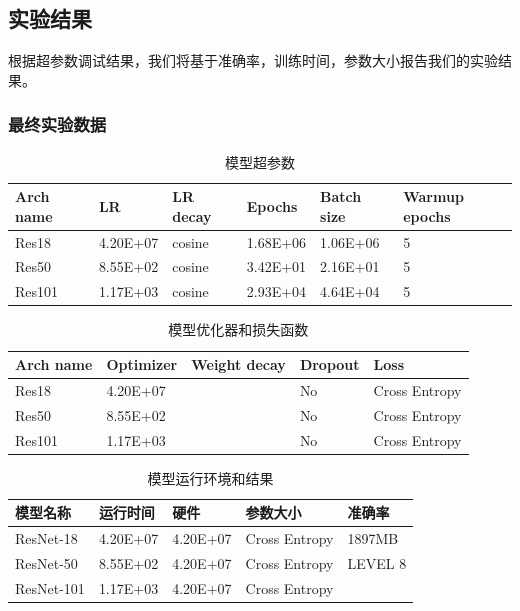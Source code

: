 \documentclass{article}
\theoremstyle{definition}
\begin{document}
\subsection{实验结果}
根据超参数调试结果，我们将基于准确率，训练时间，参数大小报告我们的实验结果。
\subsubsection{最终实验数据}
\begin{table}[h]
	\centering
	\caption{模型超参数}
	\begin{tabular}{l|l|l|l|l|l}
		\toprule
		Arch name & LR       & LR decay & Epochs   & Batch size & Warmup epochs \\ \midrule
		Res18     & 4.20E+07 & cosine   & 1.68E+06 & 1.06E+06   & 5             \\ \midrule
		Res50     & 8.55E+02 & cosine   & 3.42E+01 & 2.16E+01   & 5              \\ \midrule
		Res101    & 1.17E+03 & cosine   & 2.93E+04 & 4.64E+04   &  5            \\ \bottomrule
	\end{tabular}
\end{table}

\begin{table}[h]
	\centering
	\caption{模型优化器和损失函数}
	\begin{tabular}{l|l|l|l|l}
		\toprule
		Arch name & Optimizer& Weight decay & Dropout   & Loss           \\ \midrule
		Res18     & 4.20E+07 &         	    & No 	     & Cross Entropy  \\ \midrule
		Res50     & 8.55E+02 &              & No         & Cross Entropy  \\ \midrule
		Res101    & 1.17E+03 &              & No         & Cross Entropy  \\ \bottomrule
	\end{tabular}
\end{table}

\begin{table}[h]
	\centering
	\caption{模型运行环境和结果}
	\begin{tabular}{l|l|l|l|l}
		\toprule
		模型名称       & 运行时间      & 硬件         & 参数大小     & 准确率 	 \\ \midrule
		ResNet-18     & 4.20E+07     & 4.20E+07     & Cross Entropy  & 1897MB        \\ \midrule
		ResNet-50     & 8.55E+02     & 4.20E+07     & Cross Entropy  & LEVEL 8       \\ \midrule
		ResNet-101    & 1.17E+03     & 4.20E+07      & Cross Entropy &               \\ \bottomrule
	\end{tabular}
\end{table}
\end{document}
